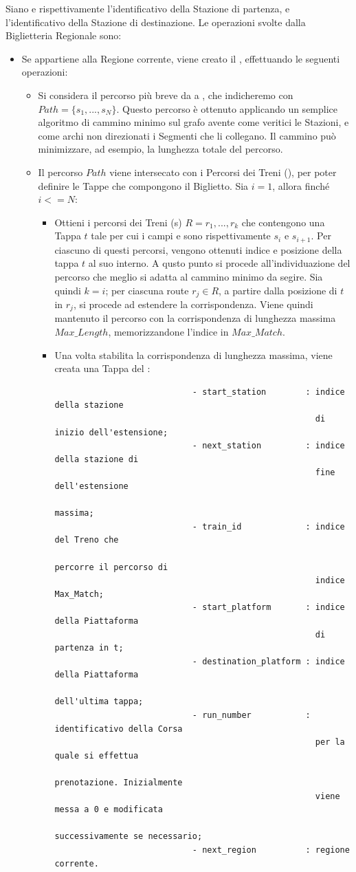 	Siano  e  rispettivamente l'identificativo della Stazione di partenza, e l'identificativo della Stazione di destinazione. Le operazioni svolte dalla Biglietteria Regionale sono:
	\begin{itemize}
		\item Se  appartiene alla Regione corrente, viene creato il , effettuando le seguenti operazioni:
			\begin {itemize}
					
				\item Si considera il percorso più breve da  a , che indicheremo con $Path = \{s_1,...,s_N\}$. Questo percorso è ottenuto applicando un semplice algoritmo di cammino minimo sul grafo avente come veritici le Stazioni, e come archi non direzionati i Segmenti che li collegano. Il cammino può minimizzare, ad esempio, la lunghezza totale del percorso.
				
				\item Il percorso $Path$ viene intersecato con i Percorsi dei Treni (), per poter definire le Tappe che compongono il Biglietto. Sia $i=1$, allora finché $i<=N$:
					\begin{itemize}
						\item Ottieni i percorsi dei Treni (s) $R={r_1,...,r_k}$ che contengono una Tappa $t$ tale per cui i campi  e  sono rispettivamente $s_i$ e $s_{i+1}$. Per ciascuno di questi percorsi, vengono ottenuti indice e posizione della tappa $t$ al suo interno.
						A qusto punto si procede all'individuazione del percorso che meglio si adatta al cammino minimo da segire. Sia quindi $k = i$; per ciascuna route $r_j \in R$, a partire dalla posizione di $t$ in $r_j$, si procede ad estendere la corrispondenza. Viene quindi mantenuto il percorso con la corrispondenza di lunghezza massima $Max\_Length$, memorizzandone l'indice in $Max\_Match$.
						\item Una volta stabilita la corrispondenza di lunghezza massima, viene creata una Tappa del :
						\begin{verbatim}
							- start_station        : indice della stazione 
							                         di inizio dell'estensione;
							- next_station         : indice della stazione di
							                         fine dell'estensione 
							                         massima;
							- train_id             : indice del Treno che 
							                         percorre il percorso di 
							                         indice Max_Match;
							- start_platform       : indice della Piattaforma
							                         di partenza in t;
							- destination_platform : indice della Piattaforma 
							                         dell'ultima tappa;
							- run_number           : identificativo della Corsa 
							                         per la quale si effettua 
							                         prenotazione. Inizialmente 
							                         viene messa a 0 e modificata 
							                         successivamente se necessario; 
							- next_region          : regione corrente.
							

\end{verbatim}
\end{itemize}
\end{itemize}
\end{itemize}
